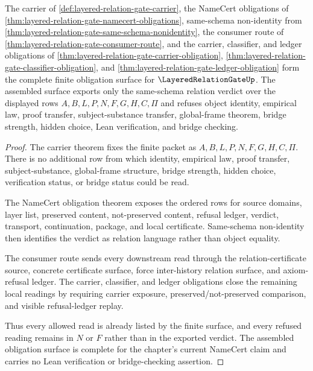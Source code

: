\begin{theorem}
\label{thm:layered-relation-gate-obligation-closure}
The carrier of \autoref{def:layered-relation-gate-carrier}, the NameCert obligations of \autoref{thm:layered-relation-gate-namecert-obligations}, same-schema non-identity from \autoref{thm:layered-relation-gate-same-schema-nonidentity}, the consumer route of \autoref{thm:layered-relation-gate-consumer-route}, and the carrier, classifier, and ledger obligations of \autoref{thm:layered-relation-gate-carrier-obligation}, \autoref{thm:layered-relation-gate-classifier-obligation}, and \autoref{thm:layered-relation-gate-ledger-obligation} form the complete finite obligation surface for $\LayeredRelationGateUp$. The assembled surface exports only the same-schema relation verdict over the displayed rows $A,B,L,P,N,F,G,H,C,\Pi$ and refuses object identity, empirical law, proof transfer, subject-substance transfer, global-frame theorem, bridge strength, hidden choice, Lean verification, and bridge checking.
\end{theorem}
\begin{proof}
The carrier theorem fixes the finite packet as $A,B,L,P,N,F,G,H,C,\Pi$. There is no additional row from which identity, empirical law, proof transfer, subject-substance, global-frame structure, bridge strength, hidden choice, verification status, or bridge status could be read.

The NameCert obligation theorem exposes the ordered rows for source domains, layer list, preserved content, not-preserved content, refusal ledger, verdict, transport, continuation, package, and local certificate. Same-schema non-identity then identifies the verdict as relation language rather than object equality.

The consumer route sends every downstream read through the relation-certificate source, concrete certificate surface, force inter-history relation surface, and axiom-refusal ledger. The carrier, classifier, and ledger obligations close the remaining local readings by requiring carrier exposure, preserved/not-preserved comparison, and visible refusal-ledger replay.

Thus every allowed read is already listed by the finite surface, and every refused reading remains in $N$ or $F$ rather than in the exported verdict. The assembled obligation surface is complete for the chapter's current NameCert claim and carries no Lean verification or bridge-checking assertion.
\end{proof}

